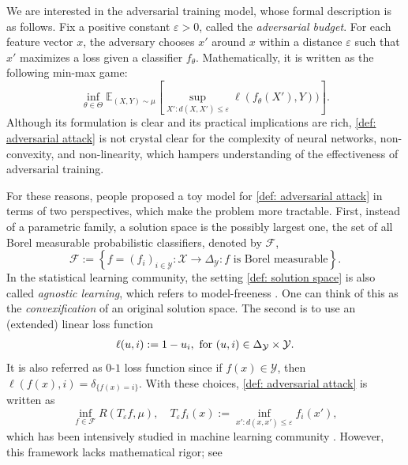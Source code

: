 \documentclass{amsart}
\theoremstyle{plain}
\numberwithin{equation}{section}\newtheorem{theorem}{Theorem}[section]
\theoremstyle{remark}
\begin{document}
We are interested in the adversarial training model, whose formal description is as follows. Fix a positive constant $\varepsilon>0$, called the \emph{adversarial budget}. For each feature vector $x$, the adversary chooses $x'$ around $x$ within a distance $\varepsilon$ such that $x'$ maximizes a loss given a classifier $f_\theta$. Mathematically, it is written as the following min-max game:
\begin{equation}\label{def: adversarial attack}
    \inf_{\theta \in \Theta} \mathbb{E}_{(X,Y) \sim \mu}  \left[ \sup_{X': d(X,X') \leq \varepsilon}\ell (f_\theta(X'), Y)) \right].
\end{equation}
Although its formulation is clear and its practical implications are rich, \eqref{def: adversarial attack} is not crystal clear for the complexity of neural networks, non-convexity, and non-linearity, which hampers understanding of the effectiveness of adversarial training. 





For these reasons, people proposed a toy model for \eqref{def: adversarial attack} in terms of two perspectives, which make the problem more tractable. First, instead of a parametric family, a solution space is the possibly largest one, the set of all Borel measurable probabilistic classifiers, denoted by $\mathcal{F}$,
\begin{equation}\label{def: solution space}
    \mathcal{F}:= \left\{ f=(f_i)_{i \in \mathcal{Y}}: \mathcal{X} \to \Delta_{\mathcal{Y}} : f \text{ is Borel measurable} \right\}.
\end{equation}
In the statistical learning community, the setting \eqref{def: solution space} is also called \emph{agnostic learning}, which refers to model-freeness \cite{agnostic_learning}. One can think of this as the \emph{convexification} of an original solution space. The second is to use an (extended) linear loss function
\begin{align*}
\label{eq:01loss}
    \ell(u, i) := 1 - u_i, \hbox{ for } (u,i) \in \Delta_{\mathcal{Y}} \times \mathcal{Y}.
\end{align*}
It is also referred as $0$-$1$ loss function since if $f(x) \in \mathcal{Y}$, then $\ell(f(x), i) = \delta_{\{f(x)=i\}}$. With these choices, \eqref{def: adversarial attack} is written as
\begin{equation}\label{eq:linear adversarial risk}
    \inf_{f \in \mathcal{F}}  R(T_\varepsilon f, \mu), \quad T_\varepsilon f_i(x) := \inf_{x' : d(x,x') \leq \varepsilon} f_i(x'),
\end{equation}
which has been intensively studied in machine learning community \cite{carlini2017magnet, athalye2018synthesizing, bose2018adversarial, Nakkiran2019AdversarialRM, Bhagoji2019LowerBO, pinot2020randomization, Meunier2021MixedNE, Pydi2021AdversarialRV, pydi2021the, awasthi2021existence, awasthi2021extended, frank2023the, frank2023existence, NEURIPS2023_81858558, jakwang_2024existence, frank2026notion}. However, this framework lacks mathematical rigor; see \cite{pydi2021the, jakwang_2024existence} 
\end{document}
